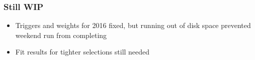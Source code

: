 \documentclass{beamer}
\newcommand{\beginbackup}{
  \newcounter{framenumbervorappendix}
  \setcounter{framenumbervorappendix}{\value{framenumber}}
}
\newcommand{\backupend}{
  \addtocounter{framenumbervorappendix}{-\value{framenumber}}
  \addtocounter{framenumber}{\value{framenumbervorappendix}}
}
\begin{document}
\begin{frame}
  \frametitle{Still WIP}

  \begin{itemize}
  \item Triggers and weights for 2016 fixed,
    but running out of disk space prevented weekend run from completing
  \item Fit results for tighter selections still needed
  \end{itemize}

\end{frame}


\begin{comment}
\beginbackup

\begin{frame}
  \centering
    {\Huge \bf\sffamily Backup Slides}
\end{frame}



\backupend
\end{comment}
\end{document}
